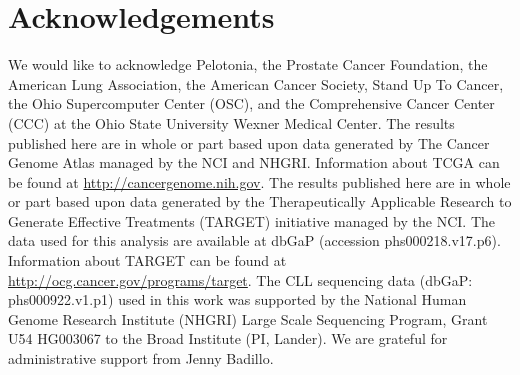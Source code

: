 \section*{Acknowledgements}
We would like to acknowledge Pelotonia, the Prostate Cancer Foundation, the American Lung Association, the American Cancer Society, Stand Up To Cancer, the Ohio Supercomputer Center (OSC), and the Comprehensive Cancer Center (CCC) at the Ohio State University Wexner Medical Center. The results published here are in whole or part based upon data generated by The Cancer Genome Atlas managed by the NCI and NHGRI. Information about TCGA can be found at \url{http://cancergenome.nih.gov}. The results published here are in whole or part based upon data generated by the Therapeutically Applicable Research to Generate Effective Treatments (TARGET) initiative managed by the NCI. The data used for this analysis are available at dbGaP (accession phs000218.v17.p6). Information about TARGET can be found at \url{http://ocg.cancer.gov/programs/target}. The CLL sequencing data (dbGaP: phs000922.v1.p1) used in this work was supported by the National Human Genome Research Institute (NHGRI) Large Scale Sequencing Program, Grant U54 HG003067 to the Broad Institute (PI, Lander). We are grateful for administrative support from Jenny Badillo.
